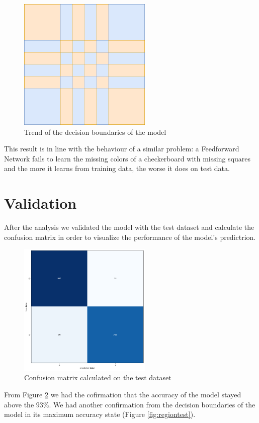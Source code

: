 \documentclass[compsoc]{IEEEtran}
\begin{document}
\begin{figure}[ht!]
\centering                                                                        
\includegraphics[width=2.5in]{../images/trend.png}
\captionsetup{justification=centering}                                                                                                                                   
\caption{Trend of the decision boundaries of the model}
\label{fig:trend}                                                                                                                                                         
\end{figure}

This result is in line with the behaviour of a similar problem: a Feedforward Network fails to learn the missing colors of a checkerboard with missing squares and the more it learns from training data, the worse it does on test data\cite{unlearnable}. \par

\section{Validation}
After the analysis we validated the model with the test dataset and calculate the confusion matrix in order to visualize the performance of the model's predictrion.
\begin{figure}[ht!]
\centering                                                                        
\includegraphics[width=2.5in]{../images/cm.png}
\captionsetup{justification=centering}                                                                                                                                   
\caption{Confusion matrix calculated on the test dataset}
\label{fig:cm}
\end{figure}
From Figure \ref{fig:cm} we had the cofirmation that the accuracy of the model stayed above the $93\%$. We had another confirmation from
the decision boundaries of the model in its maximum accuracy state (Figure \ref{fig:regiontest}).
\end{document}
